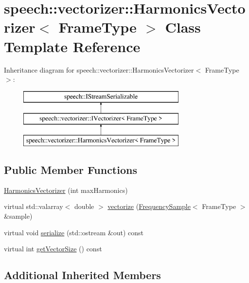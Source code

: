 \hypertarget{classspeech_1_1vectorizer_1_1HarmonicsVectorizer}{\section{speech\+:\+:vectorizer\+:\+:Harmonics\+Vectorizer$<$ Frame\+Type $>$ Class Template Reference}
\label{classspeech_1_1vectorizer_1_1HarmonicsVectorizer}
}
Inheritance diagram for speech\+:\+:vectorizer\+:\+:Harmonics\+Vectorizer$<$ Frame\+Type $>$\+:\begin{figure}[H]
\begin{center}
\leavevmode
\includegraphics[height=3.000000cm]{classspeech_1_1vectorizer_1_1HarmonicsVectorizer}
\end{center}
\end{figure}
\subsection*{Public Member Functions}
\begin{DoxyCompactItemize}
\item 
\hyperlink{classspeech_1_1vectorizer_1_1HarmonicsVectorizer_ad0a68acf0931645d967de2e944f24809}{Harmonics\+Vectorizer} (int max\+Harmonics)
\item 
virtual std\+::valarray$<$ double $>$ \hyperlink{classspeech_1_1vectorizer_1_1HarmonicsVectorizer_a7f2d8f5d43c416ae95025d63c54d4385}{vectorize} (\hyperlink{classspeech_1_1raw__data_1_1FrequencySample}{Frequency\+Sample}$<$ Frame\+Type $>$ \&sample)
\item 
virtual void \hyperlink{classspeech_1_1vectorizer_1_1HarmonicsVectorizer_a6a9467047e5acbfd0fc4bf1e72679acf}{serialize} (std\+::ostream \&out) const 
\item 
virtual int \hyperlink{classspeech_1_1vectorizer_1_1HarmonicsVectorizer_aa6c06fb4864a9bd9e67675b6d836170f}{get\+Vector\+Size} () const 
\end{DoxyCompactItemize}
\subsection*{Additional Inherited Members}



